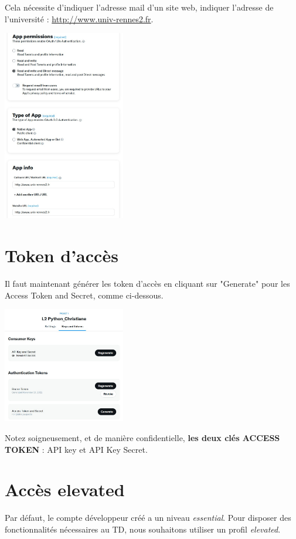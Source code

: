 \documentclass[11pt,a4paper]{article}
\begin{document}
Cela nécessite d'indiquer l'adresse mail d'un site web, indiquer l'adresse de l'université :  \url{http://www.univ-rennes2.fr}.

\begin{center}
    \includegraphics[width=0.4\textwidth]{etapes_cle/step5.jpg}
\end{center}


\section{Token d'accès}

Il faut maintenant générer les token d'accès en cliquant sur "Generate" pour les Access Token and Secret, comme ci-dessous. 
\begin{center}
    \includegraphics[width=0.4\textwidth]{etapes_cle/step4.jpg}
\end{center}
Notez soigneusement, et de manière confidentielle, \textbf{les deux clés ACCESS TOKEN } : API key et API Key Secret.







\section{Accès elevated}
Par défaut, le compte développeur créé a un niveau \emph{essential}. Pour disposer des fonctionnalités nécessaires au TD, nous souhaitons utiliser un profil \emph{elevated}.
\end{document}
